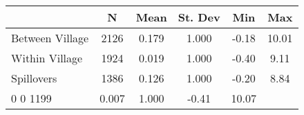 \begin{tabular}{l*{5}{c}}\hline&\multicolumn{1}{c}{N}&\multicolumn{1}{c}{Mean}&\multicolumn{1}{c}{St. Dev}&\multicolumn{1}{c}{Min}&\multicolumn{1}{c}{Max}\\ \hline 
Between Village & 2126 & 0.179 & 1.000 & -0.18 & 10.01 \\
Within Village & 1924 & 0.019 & 1.000 & -0.40 & 9.11 \\
Spillovers & 1386 & 0.126 & 1.000 & -0.20 & 8.84 \\
0 0 1199 & 0.007 & 1.000 & -0.41 & 10.07 \\
\hline \end{tabular}
